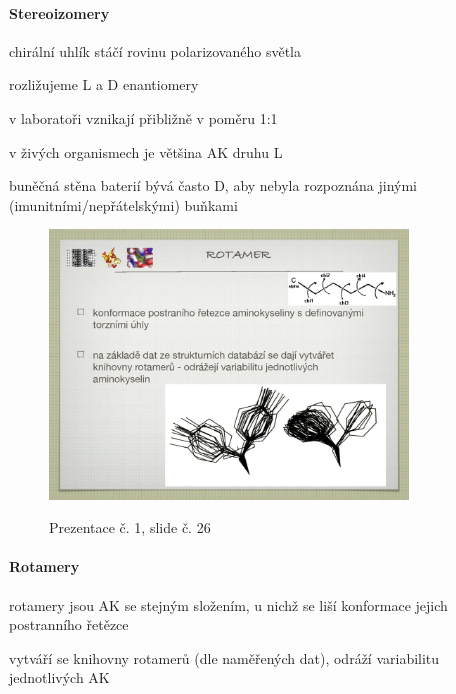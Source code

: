 \documentclass[DIV=8]{scrreprt}
\begin{document}
\paragraph{Stereoizomery}
\begin{myItemize}[nosep]
    \item chirální uhlík stáčí rovinu polarizovaného světla
    \item rozližujeme L a D enantiomery
\begin{myItemize}[nosep]
    \item v laboratoři vznikají přibližně v poměru 1:1
    \item v živých organismech je většina AK druhu L
    \item buněčná stěna baterií bývá často D, aby nebyla rozpoznána jinými (imunitními/nepřátelskými) buňkami
\end{myItemize}

\end{myItemize}



\begin{figure}
    \caption{Prezentace č. 1, slide č. 26}
    \includegraphics[width=0.85\textwidth]{slides-1/slide-26.jpg}
    \centering
    \label{slides-1-slide-26}
\end{figure}

\paragraph{Rotamery}
\begin{myItemize}[nosep]
    \item rotamery jsou AK se stejným složením, u nichž se liší konformace jejich postranního řetězce
    \item vytváří se knihovny rotamerů (dle naměřených dat), odráží variabilitu jednotlivých AK
\end{myItemize}
\end{document}
